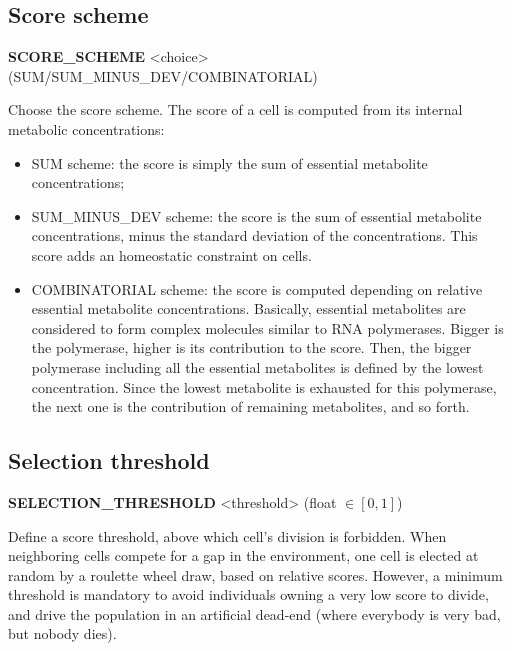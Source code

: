 
\subsection{Score scheme}
\begin{center}
{\bf SCORE\_SCHEME} <choice> (SUM/SUM\_MINUS\_DEV/COMBINATORIAL)
\end{center}
Choose the score scheme. The score of a cell is computed from its internal metabolic concentrations:
\begin{itemize}
\item SUM scheme: the score is simply the sum of essential metabolite concentrations;
\item SUM\_MINUS\_DEV scheme: the score is the sum of essential metabolite concentrations, minus the standard deviation of the concentrations. This score adds an homeostatic constraint on cells.
\item COMBINATORIAL scheme: the score is computed depending on relative essential metabolite concentrations. Basically, essential metabolites are considered to form complex molecules similar to RNA polymerases. Bigger is the polymerase, higher is its contribution to the score. Then, the bigger polymerase including all the essential metabolites is defined by the lowest concentration. Since the lowest metabolite is exhausted for this polymerase, the next one is the contribution of remaining metabolites, and so forth.
\end{itemize}


\subsection{Selection threshold}
\begin{center}
{\bf SELECTION\_THRESHOLD} <threshold> (float $\in [0, 1]$)
\end{center}
Define a score threshold, above which cell's division is forbidden. When neighboring cells compete for a gap in the environment, one cell is elected at random by a roulette wheel draw, based on relative scores. However, a minimum threshold is mandatory to avoid individuals owning a very low score to divide, and drive the population in an artificial dead-end (where everybody is very bad, but nobody dies).


